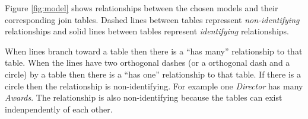 Figure \ref{fig:model} shows relationships between the chosen models and their
corresponding join tables. Dashed lines between tables repressent
\emph{non-identifying} relationships and
solid lines between tables represent \emph{identifying} relationships.

When lines branch toward a table then there is a ``has many'' relationship to
that table. When the lines have two orthogonal dashes (or a orthogonal dash and
a circle) by a table then there is a
``has one'' relationship to that table. If there is a circle then the
relationship is non-identifying.
For example one \emph{Director} has many \emph{Awards}. The relationship is
also non-identifying because the tables can exist indenpendently of each other.

